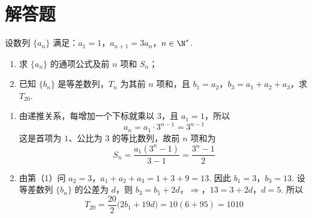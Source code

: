\section{解答题}

\begin{problem}
设数列 \(\{a_{n}\}\) 满足：\(a_{1} = 1\)，\(a_{n+1} = 3a_{n}\)，\(n \in \N^*\).
\begin{enumerate}
\item 求 \( \{a_{n}\} \) 的通项公式及前 \(n\) 项和 \( S_{n} \)；
\item 已知 \( \{b_{n}\} \) 是等差数列，\( T_{n} \) 为其前 \(n\) 项和，且 \(b_{1}=a_{2}\)，\(b_{3}=a_{1}+a_{2}+a_{3}\)，求 \(T_{20}\).
\end{enumerate}
\begin{solution}
\begin{enumerate}
\item 由递推关系，每增加一个下标就乘以 \(3\)，且 \(a_1=1\)，所以
\[
a_n=a_1\cdot3^{n-1}=3^{n-1}
\]
这是首项为 \(1\)、公比为 \(3\) 的等比数列，故前 \(n\) 项和为
\[
S_n=\frac{a_1(3^n-1)}{3-1}=\frac{3^n-1}{2}
\]
\item 由第（1）问
\(a_2=3\)，\(a_1+a_2+a_3=1+3+9=13\).
因此 \(b_1=3\)，\(b_3=13\). 设等差数列 \(\{b_n\}\) 的公差为 \(d\)，则
\(b_3=b_1+2d\)，\(\Longrightarrow\)，\(13=3+2d\)，\(d=5\).
所以
\[
T_{20}=\frac{20}{2}\bigl(2b_1+19d\bigr)
=10(6+95)=1010
\]
\end{enumerate}
\end{solution}
\end{problem}

